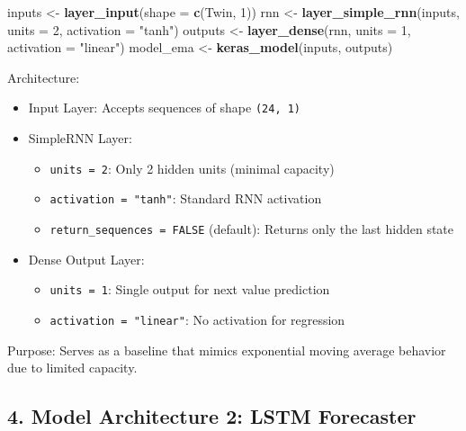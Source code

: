 \documentclass[
]{article}
\newenvironment{Shaded}{\begin{snugshade}}{\end{snugshade}}
\newcommand{\AttributeTok}[1]{\textcolor[rgb]{0.13,0.29,0.53}{#1}}
\newcommand{\DecValTok}[1]{\textcolor[rgb]{0.00,0.00,0.81}{#1}}
\newcommand{\FunctionTok}[1]{\textcolor[rgb]{0.13,0.29,0.53}{\textbf{#1}}}
\newcommand{\NormalTok}[1]{#1}
\newcommand{\OtherTok}[1]{\textcolor[rgb]{0.56,0.35,0.01}{#1}}
\newcommand{\StringTok}[1]{\textcolor[rgb]{0.31,0.60,0.02}{#1}}
\providecommand{\tightlist}{%
  \setlength{\itemsep}{0pt}\setlength{\parskip}{0pt}}
\begin{document}
\begin{Shaded}
\begin{Highlighting}[]
\NormalTok{inputs }\OtherTok{\textless{}{-}} \FunctionTok{layer\_input}\NormalTok{(}\AttributeTok{shape =} \FunctionTok{c}\NormalTok{(Twin, }\DecValTok{1}\NormalTok{))}
\NormalTok{rnn }\OtherTok{\textless{}{-}} \FunctionTok{layer\_simple\_rnn}\NormalTok{(inputs, }\AttributeTok{units =} \DecValTok{2}\NormalTok{, }\AttributeTok{activation =} \StringTok{"tanh"}\NormalTok{)}
\NormalTok{outputs }\OtherTok{\textless{}{-}} \FunctionTok{layer\_dense}\NormalTok{(rnn, }\AttributeTok{units =} \DecValTok{1}\NormalTok{, }\AttributeTok{activation =} \StringTok{"linear"}\NormalTok{)}
\NormalTok{model\_ema }\OtherTok{\textless{}{-}} \FunctionTok{keras\_model}\NormalTok{(inputs, outputs)}
\end{Highlighting}
\end{Shaded}

Architecture:

\begin{itemize}
\tightlist
\item
  Input Layer: Accepts sequences of shape \texttt{(24,\ 1)}
\item
  SimpleRNN Layer:

  \begin{itemize}
  \tightlist
  \item
    \texttt{units\ =\ 2}: Only 2 hidden units (minimal capacity)
  \item
    \texttt{activation\ =\ "tanh"}: Standard RNN activation
  \item
    \texttt{return\_sequences\ =\ FALSE} (default): Returns only the
    last hidden state
  \end{itemize}
\item
  Dense Output Layer:

  \begin{itemize}
  \tightlist
  \item
    \texttt{units\ =\ 1}: Single output for next value prediction
  \item
    \texttt{activation\ =\ "linear"}: No activation for regression
  \end{itemize}
\end{itemize}

Purpose: Serves as a baseline that mimics exponential moving average
behavior due to limited capacity.

\subsection{4. Model Architecture 2: LSTM
Forecaster}\label{model-architecture-2-lstm-forecaster}
\end{document}
